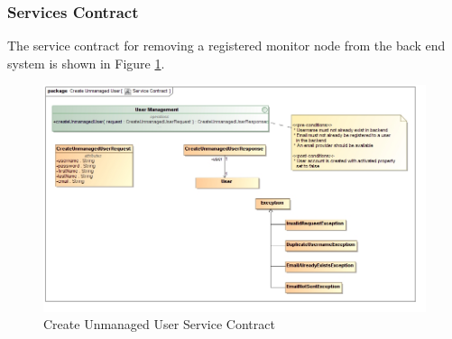 \subsubsection{Services Contract}
The service contract for removing a registered monitor node from the back end 
system is shown in Figure \ref{fig:CreateUnmanagedUserServicesContract}.
\begin{figure}[H]
  \begin{center}
  \includegraphics[scale=0.4]{../Diagrams and Charts/User Management/Create Unmanaged User Service Contract.jpg}
  \caption{Create Unmanaged User Service Contract}
  \label{fig:CreateUnmanagedUserServicesContract}
  \end{center}  
\end{figure}


